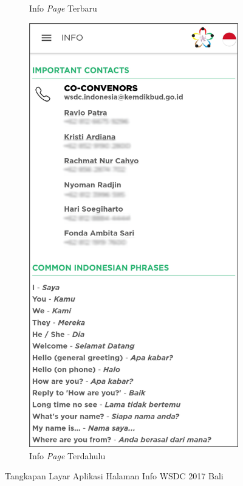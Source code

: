 \begin{figure}[H]
\begin{subfigure}[b]{0.3\textwidth}
         \caption{Info \textit{Page} Terbaru}
         \label{fig:ssInfo}
     \end{subfigure}
     \hspace*{0.5in}
     \begin{subfigure}[b]{0.3\textwidth}
         \centering
         \includegraphics[width=\textwidth]{Gambar/InfoPage.png}
         \caption{Info \textit{Page} Terdahulu}
         \label{fig:ssInfoOld}
     \end{subfigure}
        \caption{Tangkapan Layar Aplikasi Halaman Info WSDC 2017 Bali}
        \label{fig:ssApk1}
\end{figure}


